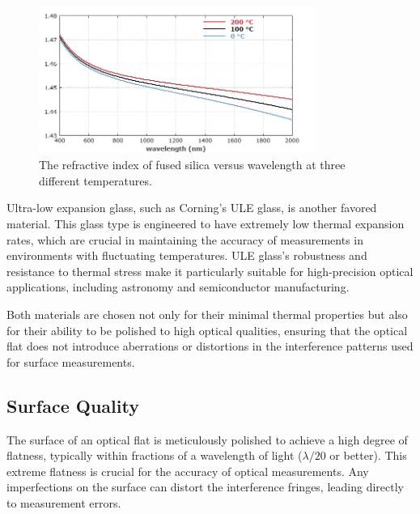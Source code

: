 \documentclass[../main.tex]{subfiles}
\begin{document}
\begin{frame}{}
    \begin{figure}[h]
        \centering
        \includegraphics[width=0.8\textwidth]{Images/Introduction/silica_refractive_index}
        \caption{The refractive index of fused silica versus wavelength at three different temperatures.\cite{Paschottafused_silica}}
        \label{fig:refractive_index_silica}
    \end{figure}
\end{frame}

Ultra-low expansion glass, such as Corning's ULE glass, is another favored material. This glass type is engineered to have extremely low thermal expansion rates, which are crucial in maintaining the accuracy of measurements in environments with fluctuating temperatures. ULE glass's robustness and resistance to thermal stress make it particularly suitable for high-precision optical applications, including astronomy and semiconductor manufacturing.\cite{Corning_2022}

Both materials are chosen not only for their minimal thermal properties but also for their ability to be polished to high optical qualities, ensuring that the optical flat does not introduce aberrations or distortions in the interference patterns used for surface measurements.\cite{Corning_2022,Paschottafused_silica,doi:https://doi.org/10.1002/9780470135976.ch1}

\subsection{Surface Quality}
The surface of an optical flat is meticulously polished to achieve a high degree of flatness, typically within fractions of a wavelength of light (\(\lambda/20\) or better). This extreme flatness is crucial for the accuracy of optical measurements. Any imperfections on the surface can distort the interference fringes, leading directly to measurement errors.\cite{enwiki:1212101911}
\end{document}
